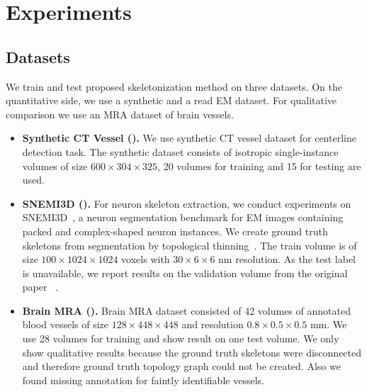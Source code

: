 
\chapter{Experiments}\label{chapter:experiments}

\section{Datasets}
We train and test proposed skeletonization method on three datasets. On the quantitative side, we use a synthetic and a read EM dataset. For qualitative comparison we use an MRA dataset of brain vessels.

\begin{itemize}
	\item \textbf{Synthetic CT Vessel (\cite{Tetteh2018}).} We use synthetic CT vessel dataset for centerline detection task. The synthetic dataset consists of isotropic single-instance volumes of size $600\times304\times325$, 20 volumes for training and 15 for testing are used.
	
	\item \textbf{SNEMI3D (\cite{SNEMI3D}).} For neuron skeleton extraction, we conduct experiments on SNEMI3D~\cite{SNEMI3D}, a neuron segmentation benchmark for EM images containing packed and complex-shaped neuron instances. We create ground truth skeletons from segmentation by topological thinning~\cite{palagyi2014sequential}. The train volume is of size $100\times1024\times1024$ voxels with $30\times6\times6$ nm resolution. 
	As the test label is unavailable, we report results on the validation volume from the original paper ~\cite{Kasthuri2015}.
	
	\item  \textbf{Brain MRA (\cite{Bullitt2005}).} Brain MRA dataset consisted of 42 volumes of annotated blood vessels of size $128\times448\times448$ and resolution $0.8\times0.5\times0.5$ mm. We use 28 volumes for training and show result on one test volume. We only show qualitative results because the ground truth skeletons were disconnected and therefore ground truth topology graph could not be created. Also we found missing annotation for faintly identifiable vessels. 
\end{itemize}

